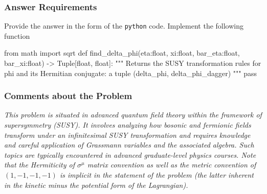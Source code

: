 \subsubsection*{Answer Requirements}
Provide the answer in the form of the \texttt{python} code. Implement the following function 
\begin{python}
from math import sqrt
def find_delta_phi(eta:float, xi:float, bar_eta:float, bar_xi:float) -> Tuple[float, float]:
    """
    Returns the SUSY transformation rules for phi and its Hermitian conjugate: 
    a tuple (delta_phi, delta_phi_dagger)
    """
    pass
\end{python}


\subsubsection*{Comments about the Problem}
\textit{This problem is situated in advanced quantum field theory within the framework of supersymmetry (SUSY). It involves analyzing how bosonic and fermionic fields transform under an infinitesimal SUSY transformation and requires knowledge and careful application of Grassmann variables and the associated algebra. Such topics are typically encountered in advanced graduate-level physics courses.  Note that the Hermiticity of $\sigma^\mu$ matrix convention as well as the metric convention of $(1,-1,-1,-1)$ is implicit in the statement of the problem (the latter inherent in the kinetic minus the potential form of the Lagrangian).}


